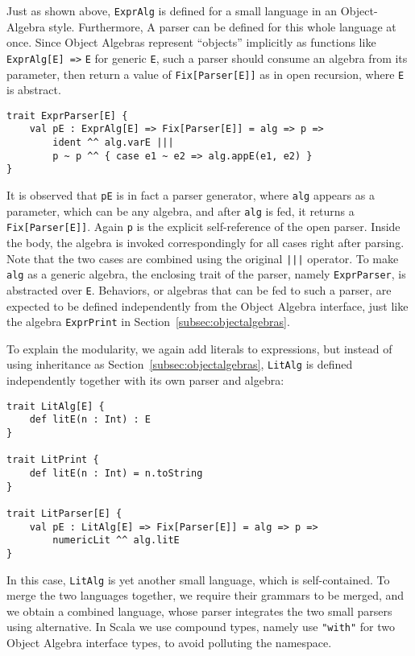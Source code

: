 Just as shown above, \lstinline{ExprAlg} is defined for a small language in an Object-Algebra style. Furthermore,
A parser can be defined for this whole language at once. Since Object Algebras represent ``objects'' implicitly as functions like \lstinline{ExprAlg[E] =>} \lstinline{E} for generic \lstinline{E}, such a parser should consume an algebra from its parameter, then return a value of \lstinline{Fix[Parser[E]]} as in open recursion, where \lstinline{E} is abstract.
\begin{lstlisting}
trait ExprParser[E] {
    val pE : ExprAlg[E] => Fix[Parser[E]] = alg => p =>
        ident ^^ alg.varE |||
        p ~ p ^^ { case e1 ~ e2 => alg.appE(e1, e2) }
}
\end{lstlisting}
It is observed that \lstinline{pE} is in fact a parser generator, where \lstinline{alg} appears as a parameter, which can be any algebra, and after \lstinline{alg} is fed, it returns a \lstinline{Fix[Parser[E]]}. Again \lstinline{p} is the explicit self-reference of the open parser. Inside the body, the algebra is invoked correspondingly for all cases right after parsing. Note that the two cases are combined using the original \lstinline{|||} operator. To make \lstinline{alg} as a generic algebra, the enclosing trait of the parser, namely \lstinline{ExprParser}, is abstracted over \lstinline{E}. Behaviors, or algebras that can be fed to such a parser, are expected to be defined independently from the Object Algebra interface, just like the algebra \lstinline{ExprPrint} in Section~\ref{subsec:objectalgebras}.

To explain the modularity, we again add literals to expressions, but instead of using inheritance as Section~\ref{subsec:objectalgebras}, \lstinline{LitAlg} is defined independently together with its own parser and algebra:
\begin{lstlisting}
trait LitAlg[E] {
    def litE(n : Int) : E
}

trait LitPrint {
    def litE(n : Int) = n.toString
}

trait LitParser[E] {
    val pE : LitAlg[E] => Fix[Parser[E]] = alg => p =>
        numericLit ^^ alg.litE
}
\end{lstlisting}
In this case, \lstinline{LitAlg} is yet another small language, which is self-contained. To merge the two languages together, we require their grammars
to be merged, and we obtain a combined language, whose parser integrates the two small parsers using alternative. In Scala we use compound types, namely use \lstinline{"with"} for two Object Algebra interface types, to avoid polluting the namespace.

